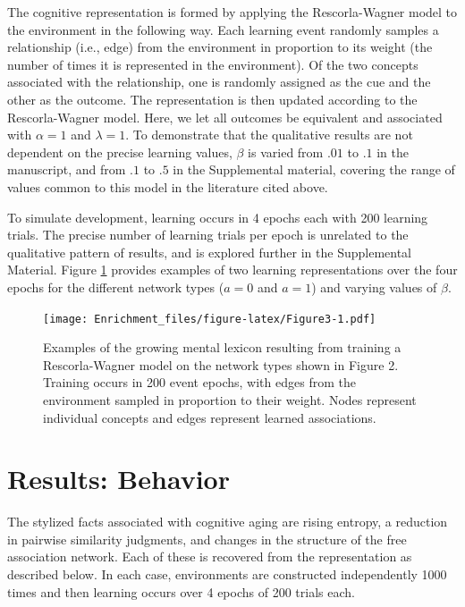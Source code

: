\documentclass[
  man,floatsintext]{apa6}
\begin{document}
The cognitive representation is formed by applying the Rescorla-Wagner model to the environment in the following way. Each learning event randomly samples a relationship (i.e., edge) from the environment in proportion to its weight (the number of times it is represented in the environment). Of the two concepts associated with the relationship, one is randomly assigned as the cue and the other as the outcome. The representation is then updated according to the Rescorla-Wagner model. Here, we let all outcomes be equivalent and associated with \(\alpha=1\) and \(\lambda=1\). To demonstrate that the qualitative results are not dependent on the precise learning values, \(\beta\) is varied from \(.01\) to \(.1\) in the manuscript, and from \(.1\) to \(.5\) in the Supplemental material, covering the range of values common to this model in the literature cited above.

To simulate development, learning occurs in 4 epochs each with 200 learning trials. The precise number of learning trials per epoch is unrelated to the qualitative pattern of results, and is explored further in the Supplemental Material. Figure \ref{fig:Figure3} provides examples of two learning representations over the four epochs for the different network types (\(a=0\) and \(a=1\)) and varying values of \(\beta\).

\begin{figure}
\centering
\texttt{[image: Enrichment\_files/figure-latex/Figure3-1.pdf]}
\caption{\label{fig:Figure3}Examples of the growing mental lexicon resulting from training a Rescorla-Wagner model on the network types shown in Figure 2. Training occurs in 200 event epochs, with edges from the environment sampled in proportion to their weight. Nodes represent individual concepts and edges represent learned associations.}
\end{figure}

\hypertarget{results-behavior}{%
\section{Results: Behavior}\label{results-behavior}}

The stylized facts associated with cognitive aging are rising entropy, a reduction in pairwise similarity judgments, and changes in the structure of the free association network. Each of these is recovered from the representation as described below. In each case, environments are constructed independently 1000 times and then learning occurs over 4 epochs of 200 trials each.
\end{document}
